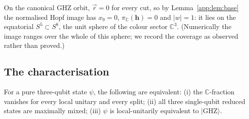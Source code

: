 \begin{corollary}\label{app:cor:s5}
On the canonical GHZ orbit, $\vec r = 0$ for every cut, so by Lemma~\ref{app:lem:base} the
normalised Hopf image has $x_9 = 0$, $\pi_{\mathbb{C}}(\mathbf{h}) = 0$ and $|w| = 1$: it lies on
the equatorial $S^5\subset S^8$, the unit sphere of the colour sector $\mathbb{C}^3$. (Numerically
the image ranges over the whole of this sphere; we record the coverage as observed rather than
proved.)
\end{corollary}

\subsection{The characterisation}

\begin{theorem}\label{app:thm:char}
For a pure three-qubit state $\psi$, the following are equivalent:
(i) the $\mathbb{C}$-fraction vanishes for every local unitary and every split;
(ii) all three single-qubit reduced states are maximally mixed;
(iii) $\psi$ is local-unitarily equivalent to $\lvert\mathrm{GHZ}\rangle$.
\end{theorem}

